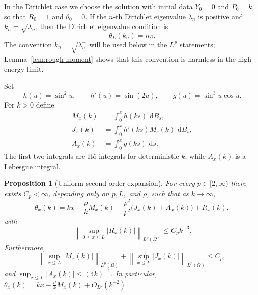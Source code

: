 \documentclass[11pt]{article}
\newtheorem{proposition}[theorem]{Proposition}
\newcommand{\dd}{\,\mathrm d}
\begin{document}
In the Dirichlet case we choose the solution with initial data $Y_0=0$ and $P_0=k$, so that $R_0=1$ and $\theta_0=0$. If the $n$-th Dirichlet eigenvalue $\lambda_n$ is positive and $k_n=\sqrt{\lambda_n}$, then the Dirichlet eigenvalue condition is
\[
    \theta_L(k_n)=n\pi .
\]
The convention $k_n=\sqrt{\lambda_n^+}$ will be used below in the $L^p$ statements; Lemma~\ref{lem:rough-moment} shows that this convention is harmless in the high-energy limit.

Set
\[
    h(u)=\sin^2u,
    \qquad h'(u)=\sin(2u),
    \qquad g(u)=\sin^3u\cos u.
\]
For $k>0$ define
\begin{align*}
    M_x(k)&=\int_0^x h(ks)\,\dd B_s,\\
    J_x(k)&=\int_0^x h'(ks)M_s(k)\,\dd B_s,\\
    A_x(k)&=\int_0^x g(ks)\,\dd s.
\end{align*}
The first two integrals are It\^o integrals for deterministic $k$, while $A_x(k)$ is a Lebesgue integral.

\begin{proposition}[Uniform second-order expansion]\label{prop:angle-expansion}
For every $p\in[2,\infty)$ there exists $C_p<\infty$, depending only on $p,L,$ and $\rho$, such that as $k\to\infty$,
\begin{equation}\label{eq:theta-expansion}
    \theta_x(k)
    =kx-\frac{\rho}{k}M_x(k)
    +\frac{\rho^2}{k^2}\bigl(J_x(k)+A_x(k)\bigr)
    +R_x(k),
\end{equation}
with
\[
    \left\|\sup_{0\le x\le L}|R_x(k)|\right\|_{L^p(\Omega)}\le C_pk^{-3}.
\]
Furthermore,
\[
    \left\|\sup_{x\le L}|M_x(k)|\right\|_{L^p(\Omega)}
    +\left\|\sup_{x\le L}|J_x(k)|\right\|_{L^p(\Omega)}
    \le C_p,
\]
and $\sup_{x\le L}|A_x(k)|\le (4k)^{-1}$. In particular, $\theta_x(k)=kx-\frac{\rho}{k}M_x(k)+O_{L^p}(k^{-2})$.
\end{proposition}
\end{document}
